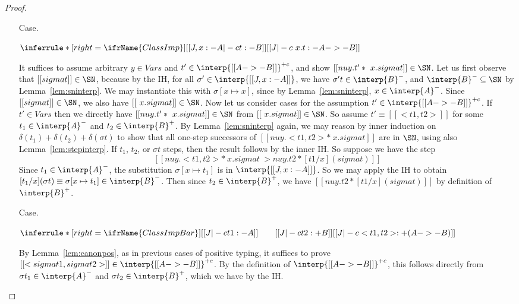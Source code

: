 \begin{proof}
\begin{itemize}
\item[Case.]\ 

\vspace{-.2cm}
\begin{center}
\begin{math}
\inferrule* [right=\ifrName{ClassImp}] {[[J , x : - A |-c t : - B]]}{[[J |-c \ x . t : - A ->- B]]}
\end{math}
\end{center}
It suffices to assume arbitrary $y\in\textit{Vars}$ and
$t'\in\interp{[[A ->- B]]}^{+c}$, and show $[[ nu y . t' * \ x . sigma
t]]\in\SN$.  Let us first observe that $[[sigma t]]\in\SN$, because by
the IH, for all $\sigma'\in\interp{[[J , x : - A]]}$, we have $\sigma'
t\in\interp{B}^-$, and $\interp{B}^-\subseteq\SN$ by
Lemma~\ref{lem:sninterp}.  We may instantiate this with
$\sigma[x\mapsto x]$, since by Lemma~\ref{lem:sninterp},
$x\in\interp{A}^-$.  Since $[[sigma t]]\in\SN$, we also have $[[\ x
. sigma t]]\in\SN$.  Now let us consider cases for the assumption
$t'\in\interp{[[A ->- B]]}^{+c}$.  If $t'\in\textit{Vars}$ then we
directly have $[[ nu y . t' * \ x . sigma t]]\in\SN$ from $[[\ x
. sigma t]]\in\SN$.  So assume $t'\equiv[[< t1 , t2>]]$ for some
$t_1\in\interp{A}^-$ and $t_2\in\interp{B}^+$.  By
Lemma~\ref{lem:sninterp} again, we may reason by inner induction on
$\delta(t_1)+\delta(t_2)+\delta(\sigma t)$ to show that all one-step
successors of $[[ nu y . < t1 , t2 > * \ x . sigma t]]$ are in $\SN$,
using also Lemma~\ref{lem:stepinterp}.  If $t_1$, $t_2$, or $\sigma t$
steps, then the result follows by the inner IH.  So suppose we have
the step
\[
[[ nu y . < t1 , t2 > * \ x . sigma t ~>  nu y . t2 * [t1 / x ] (sigma t) ]]
\]
Since $t_1\in\interp{A}^-$, the substitution $\sigma[x\mapsto t_1]$ is
in $\interp{[[J , x : - A]]}$.  So we may apply the IH to obtain $[t_1
/ x ] (\sigma t) \equiv \sigma[x\mapsto t_1]\in\interp{B}^-$.  Then
since $t_2\in\interp{B}^+$, we have $[[nu y . t2 * [t1 / x ] (sigma t)
]]$ by definition of $\interp{B}^+$.

\item[Case.]\ 

\vspace{-.2cm}
\begin{center}
\begin{math}
\inferrule* [right=\ifrName{ClassImpBar}] {[[J |-c t1 : - A]]  \qquad [[ J |-c t2 : + B ]]}{[[ J |-c < t1 , t2 > : + (A ->- B) ]]}
\end{math}
\end{center}
By Lemma~\ref{lem:canonpos}, as in previous cases of positive typing,
it suffices to prove $[[< sigma t1 , sigma t2>]]\in\interp{[[A ->-
  B]]}^{+c}$.  By the definition of $\interp{[[A ->- B]]}^{+c}$, this
follows directly from $\sigma t_1\in\interp{A}^-$ and $\sigma
t_2\in\interp{B}^+$, which we have by the IH.


\end{itemize}
\end{proof}
